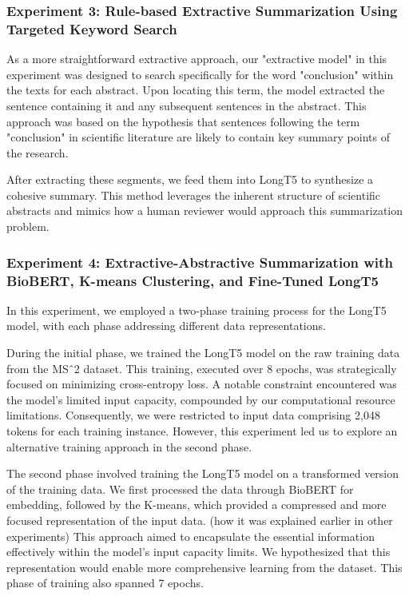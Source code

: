 \documentclass[11pt]{article}
\begin{document}
\subsubsection{Experiment 3: Rule-based Extractive Summarization Using Targeted Keyword Search}
As a more straightforward extractive approach, our "extractive model" in this experiment was designed to search specifically for the word "conclusion" within the texts for each abstract. Upon locating this term, the model extracted the sentence containing it and any subsequent sentences in the abstract. This approach was based on the hypothesis that sentences following the term "conclusion" in scientific literature are likely to contain key summary points of the research.

After extracting these segments, we feed them into LongT5 to synthesize a cohesive summary. This method leverages the inherent structure of scientific abstracts and mimics how a human reviewer would approach this summarization problem.

\subsubsection{Experiment 4: Extractive-Abstractive Summarization with BioBERT, K-means Clustering, and Fine-Tuned LongT5}
In this experiment, we employed a two-phase training process for the LongT5 model, with each phase addressing different data representations.

During the initial phase, we trained the LongT5 model on the raw training data from the MSˆ2 dataset. This training, executed over 8 epochs, was strategically focused on minimizing cross-entropy loss. A notable constraint encountered was the model's limited input capacity, compounded by our computational resource limitations. Consequently, we were restricted to input data comprising 2,048 tokens for each training instance. However, this experiment led us to explore an alternative training approach in the second phase.

The second phase involved training the LongT5 model on a transformed version of the training data. We first processed the data through BioBERT for embedding, followed by the K-means, which provided a compressed and more focused representation of the input data. (how it was explained earlier in other experiments) This approach aimed to encapsulate the essential information effectively within the model’s input capacity limits. We hypothesized that this representation would enable more comprehensive learning from the dataset. This phase of training also spanned 7 epochs.
\end{document}
